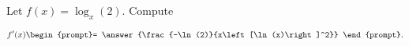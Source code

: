 \documentclass{ximera}
\author{Steven Gubkin}
\begin{document}
\begin{exercise}

Let $f(x) = \log_{x}(2)$. Compute

\[
f'(x) \begin{prompt}= \answer{\frac{-\ln(2)}{x\left[\ln(x)\right]^2}}
\end{prompt}.
\]



\end{exercise}
\end{document}
